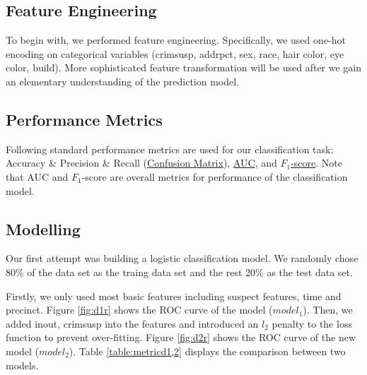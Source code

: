 \documentclass[letterpaper, twocolumn]{article}
\begin{document}
\subsection{Feature Engineering}
To begin with, we performed feature engineering. Specifically, we used one-hot encoding on categorical variables (crimsusp, addrpct, sex, race, hair color, eye color, build). More sophisticated feature transformation will be used after we gain an elementary understanding of the prediction model.

\subsection{Performance Metrics}

Following standard performance metrics are used for our classification task: Accuracy \& Precision \& Recall (\href{https://en.wikipedia.org/wiki/Confusion_matrix}{Confusion Matrix}), \href{https://en.wikipedia.org/wiki/Receiver_operating_characteristic}{AUC}, and \href{https://en.wikipedia.org/wiki/F1_score}{$F_1$-score}.
%
%
Note that AUC and $F_1$-score are overall metrics for performance of the classification model. %


\subsection{Modelling}
Our first attempt was building a logistic classification model. We randomly chose 80\% of the data set as the traing data set and the rest 20\% as the test data set.

Firstly, we only used most basic features including suspect features, time and precinct. Figure \ref{fig:d1r} shows the ROC curve of the model ($model_1$). Then, we added inout, crimsusp into the features and introduced an $l_2$ penalty to the loss function to prevent over-fitting. Figure \ref{fig:d2r} shows the ROC curve of the new model ($model_2$). Table \ref{table:metricd1,2} displays the comparison between two models. 
\end{document}
